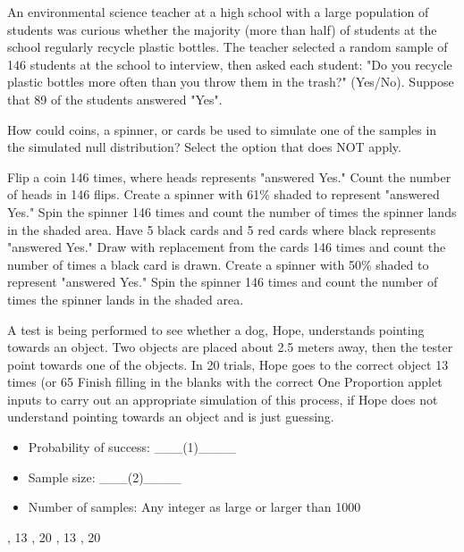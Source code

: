\documentclass{exam}
\begin{document}
	\begin{questions}
			
		
		\question An environmental science teacher at a high school with a large population of students was curious whether the majority (more than half) of students at the school regularly recycle plastic bottles. The teacher selected a random sample of 146 students at the school to interview, then asked each student: "Do you recycle plastic bottles more often than you throw them in the trash?" (Yes/No). Suppose that 89 of the students answered "Yes".
		
		How could coins, a spinner, or cards be used to simulate one of the samples in the simulated null distribution? Select the option that does NOT apply.
		\begin{choices}
			\choice Flip a coin 146 times, where heads represents "answered Yes." Count the number of heads in 146 flips.
			\correctchoice Create a spinner with 61\% shaded to represent "answered Yes." Spin the spinner 146 times and count the number of times the spinner lands in the shaded area.
			\choice Have 5 black cards and 5 red cards where black represents "answered Yes."  Draw with replacement from the cards 146 times and count the number of times a black card is drawn.
			\choice Create a spinner with 50\% shaded to represent "answered Yes." Spin the spinner 146 times and count the number of times the spinner lands in the shaded area.
		\end{choices}
		
		\question A test is being performed to see whether a dog, Hope, understands pointing towards an object. Two objects are placed about 2.5 meters away, then the tester point towards one of the objects. In 20 trials, Hope goes to the correct object 13 times (or 65%
		Finish filling in the blanks with the correct One Proportion applet inputs to carry out an appropriate simulation of this process, if Hope does not understand pointing towards an object and is just guessing.
		\begin{itemize}
			\item Probability of success: \_\_\_(1)\_\_\_\_
			\item Sample size: \_\_\_(2)\_\_\_\_
			\item Number of samples: Any integer as large or larger than 1000
		\end{itemize}
		\begin{oneparchoices}
			, 13
			, 20
			, 13
			, 20
		\end{oneparchoices}
		

\end{questions}
\end{document}
